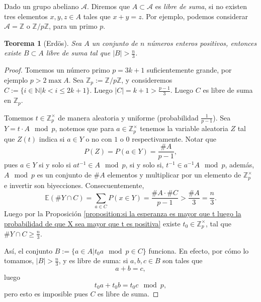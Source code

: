 \documentclass[12pt]{report}
\theoremstyle{plain}
\newtheorem{theorem}{Teorema}[section]
\theoremstyle{definition}
\newcommand{\integers}{\mathbb{Z}}
\newcommand{\naturals}{\mathbb{N}}
\newcommand{\abs}[1]{\left \vert #1 \right \vert}
\begin{document}
\bigskip

Dado un grupo abeliano $\mathcal A$. Diremos que $A \subset \mathcal A$ es \textit{libre de suma}, si no existen tres elementos $x,y,z \in A$ tales que $x + y = z$. Por ejemplo, podemos considerar $\mathcal A = \integers$ o $\integers / p \integers$, para un primo $p$.

\begin{theorem}[Erdös]
Sea $A$ un conjunto de $n$ números enteros positivos, entonces existe $B \subset A$ libre de suma tal que $\abs B > \frac n 3$.
\end{theorem}
\begin{proof}
Tomemos un número primo $p = 3k +1$ suficientemente grande, por ejemplo $p > 2 \max {A}$. Sea $\integers_p := \integers / p \integers$, y consideremos $C := \{ i \in \naturals | k < i \leq 2k +1\}$. Luego $\abs C = k + 1 > \frac{p-1}3$. Luego $C$ es libre de suma en $\integers _p$.

Tomemos $t \in \integers_{p}^\times$ de manera aleatoria y uniforme (probabilidad $\frac 1 {p-1}$). Sea $Y = t \cdot A \mod p$, notemos que para $a \in \integers_p^\times$ tenemos la variable aleatoria $Z$ tal que $Z(t)$ indica si $a \in Y$ o no con $1$ o $0$ respectivamente. Notar que
\[
    P(Z) = P(a \in Y) = \frac{\# A}{p-1},
\]
pues $a \in Y$ si y solo si $a t^{-1} \in A \mod p$, si y solo si, $t^{-1} \in a^{-1} A \mod p$, además, $A \mod p$ es un conjunto de $\#A$ elementos y multiplicar por un elemento de $\integers_p^\times$ e invertir son biyecciones.
Consecuentemente,
\[
    \mathbb{E}(\# Y \cap C) = \sum_{a \in C} P (x \in Y) = \frac{\#A \cdot \#C}{p-1} > \frac{\#A}{3} = \frac n 3.
\]
Luego por la Proposición \ref{proposition:si la esperanza es mayor que t luego la probabilidad de que X sea mayor que t es positiva} existe $t_0 \in \integers_p^\times$, tal que $\# Y \cap C \geq \frac n 3$.

Así, el conjunto $B := \{a \in A  | t_0 a \mod p \in C\}$ funciona. En efecto, por cómo lo tomamos, $\abs B > \frac n 3$, y es libre de suma: si $a,b,c \in B$ son tales que
\[
    a + b = c,
\]
luego
\[
    t_0 a +t_0 b = t_0 c \mod p,
\]
pero esto es imposible pues $C$ es libre de suma.
\end{proof}
\end{document}
